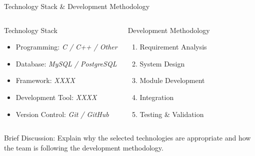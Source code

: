 \documentclass[aspectratio=169,11pt]{beamer}
\newcommand{\smallnote}[1]{%
\vspace{0.08cm}
{\scriptsize\color{GEUGrey}#1}
}
\newcommand{\placeholder}[1]{%
\textit{\color{GEUGrey}#1}
}
\begin{document}
\begin{frame}{Technology Stack \& Development Methodology}

\begin{columns}[T,totalwidth=\textwidth]


\begin{block}{Technology Stack}

\begin{itemize}\itemsep2pt
\item Programming: \placeholder{C / C++ / Other}
\item Database: \placeholder{MySQL / PostgreSQL}
\item Framework: \placeholder{XXXX}
\item Development Tool: \placeholder{XXXX}
\item Version Control: \placeholder{Git / GitHub}
\end{itemize}

\end{block}


\begin{block}{Development Methodology}

\begin{enumerate}\itemsep2pt
\item Requirement Analysis
\item System Design
\item Module Development
\item Integration
\item Testing \& Validation
\end{enumerate}

\end{block}

\end{columns}

\vfill

\smallnote{
Brief Discussion: Explain why the selected technologies are appropriate
and how the team is following the development methodology.
}

\end{frame}
\end{document}
